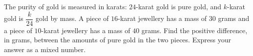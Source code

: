 The purity of gold is measured in karats: $24$-karat gold is pure gold, and $k$-karat gold is $\dfrac{k}{24}$ gold by mass. A piece of $16$-karat jewellery has a mass of $30$ grams and a piece of $10$-karat jewellery has a mass of $40$ grams. Find the positive difference, in grams, between the amounts of pure gold in the two pieces. Express your answer as a mixed number.
